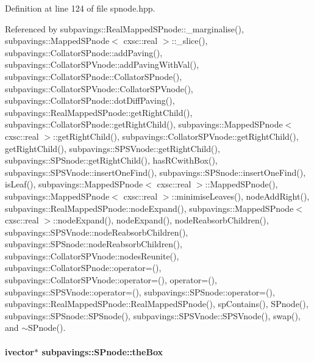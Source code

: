 \-Definition at line 124 of file spnode.\-hpp.



\-Referenced by subpavings\-::\-Real\-Mapped\-S\-Pnode\-::\-\_\-marginalise(), subpavings\-::\-Mapped\-S\-Pnode$<$ cxsc\-::real $>$\-::\-\_\-slice(), subpavings\-::\-Collator\-S\-Pnode\-::add\-Paving(), subpavings\-::\-Collator\-S\-P\-Vnode\-::add\-Paving\-With\-Val(), subpavings\-::\-Collator\-S\-Pnode\-::\-Collator\-S\-Pnode(), subpavings\-::\-Collator\-S\-P\-Vnode\-::\-Collator\-S\-P\-Vnode(), subpavings\-::\-Collator\-S\-Pnode\-::dot\-Diff\-Paving(), subpavings\-::\-Real\-Mapped\-S\-Pnode\-::get\-Right\-Child(), subpavings\-::\-Collator\-S\-Pnode\-::get\-Right\-Child(), subpavings\-::\-Mapped\-S\-Pnode$<$ cxsc\-::real $>$\-::get\-Right\-Child(), subpavings\-::\-Collator\-S\-P\-Vnode\-::get\-Right\-Child(), get\-Right\-Child(), subpavings\-::\-S\-P\-S\-Vnode\-::get\-Right\-Child(), subpavings\-::\-S\-P\-Snode\-::get\-Right\-Child(), has\-R\-Cwith\-Box(), subpavings\-::\-S\-P\-S\-Vnode\-::insert\-One\-Find(), subpavings\-::\-S\-P\-Snode\-::insert\-One\-Find(), is\-Leaf(), subpavings\-::\-Mapped\-S\-Pnode$<$ cxsc\-::real $>$\-::\-Mapped\-S\-Pnode(), subpavings\-::\-Mapped\-S\-Pnode$<$ cxsc\-::real $>$\-::minimise\-Leaves(), node\-Add\-Right(), subpavings\-::\-Real\-Mapped\-S\-Pnode\-::node\-Expand(), subpavings\-::\-Mapped\-S\-Pnode$<$ cxsc\-::real $>$\-::node\-Expand(), node\-Expand(), node\-Reabsorb\-Children(), subpavings\-::\-S\-P\-S\-Vnode\-::node\-Reabsorb\-Children(), subpavings\-::\-S\-P\-Snode\-::node\-Reabsorb\-Children(), subpavings\-::\-Collator\-S\-P\-Vnode\-::nodes\-Reunite(), subpavings\-::\-Collator\-S\-Pnode\-::operator=(), subpavings\-::\-Collator\-S\-P\-Vnode\-::operator=(), operator=(), subpavings\-::\-S\-P\-S\-Vnode\-::operator=(), subpavings\-::\-S\-P\-Snode\-::operator=(), subpavings\-::\-Real\-Mapped\-S\-Pnode\-::\-Real\-Mapped\-S\-Pnode(), sp\-Contains(), \-S\-Pnode(), subpavings\-::\-S\-P\-Snode\-::\-S\-P\-Snode(), subpavings\-::\-S\-P\-S\-Vnode\-::\-S\-P\-S\-Vnode(), swap(), and $\sim$\-S\-Pnode().

\hypertarget{classsubpavings_1_1SPnode_a2c09d2f687401550468bad6a6dae9832}{
\paragraph[{the\-Box}]{\setlength{\rightskip}{0pt plus 5cm}ivector$\ast$ {\bf subpavings\-::\-S\-Pnode\-::the\-Box}}}\label{classsubpavings_1_1SPnode_a2c09d2f687401550468bad6a6dae9832}


